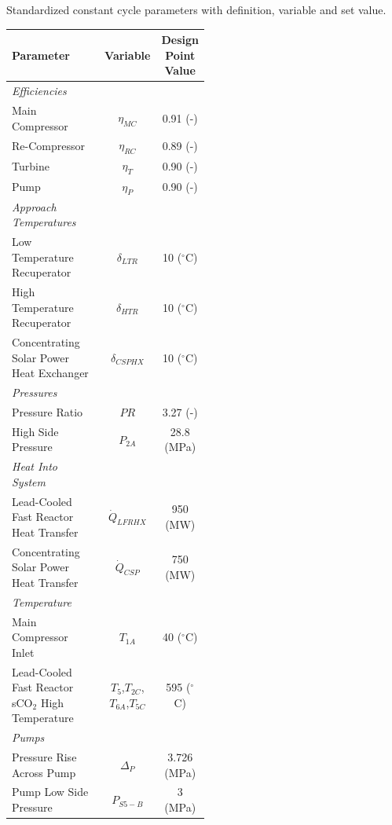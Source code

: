 \begin{paracol}{2}
\begin{specialtable}[H] 
    \caption{Standardized constant cycle parameters with definition, variable and set value. \label{tab-cycle-constants}}
    \begin{tabular}{L{0.5\linewidth}cc}
    \toprule
    \textbf{Parameter} & \textbf{Variable}	& \textbf{Design Point Value}\\
    \midrule
    \textit{Efficiencies}\\
    Main Compressor & $\eta_{MC}$		& 0.91 (-)\\
    Re-Compressor & $\eta_{RC}$		& 0.89 (-)\\
    Turbine & $\eta_{T}$		& 0.90 (-)\\
    Pump & $\eta_{P}$      & 0.90 (-)\\
    \midrule
    \textit{Approach Temperatures}\\
    Low Temperature Recuperator & $\delta_{LTR}$		& 10 ($^{\circ}$C)\\
    High Temperature Recuperator & $\delta_{HTR}$		& 10 ($^{\circ}$C)\\
    Concentrating Solar Power Heat Exchanger & $\delta_{CSPHX}$	& 10 ($^{\circ}$C)\\
    \midrule
    \textit{Pressures}\\
    Pressure Ratio & $PR$ & 3.27 (-)\\
    High Side Pressure & $P_{2A}$ & 28.8 (MPa)\\
    \midrule
    \textit{Heat Into System}\\
    Lead-Cooled Fast Reactor Heat Transfer & $\dot{Q}_{LFRHX}$ & 950 (MW)\\
    Concentrating Solar Power Heat Transfer & $\dot{Q}_{CSP}$ & 750 (MW)\\
    \midrule
    \textit{Temperature}\\
    Main Compressor Inlet & $T_{1A}$ & 40 ($^{\circ}$C)\\
    Lead-Cooled Fast Reactor sCO$_{2}$ High Temperature & $T_{5}$,$T_{2C}$,$T_{6A}$,$T_{5C}$ & 595 ($^{\circ}$C)\\
    \midrule
    \textit{Pumps}\\
    Pressure Rise Across Pump & $\Delta_{P}$ & 3.726 (MPa)\\
    Pump Low Side Pressure & $P_{S5-B}$ & 3 (MPa)\\ 
    \bottomrule
    \end{tabular}
\end{specialtable}


\end{paracol}
